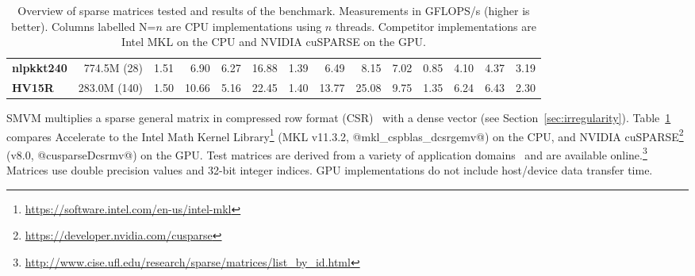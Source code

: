 \begin{table}
\begin{scriptsize}
\begin{center}
{\begin{tabular}{lrrrrrrrrrrrrr}
  \textbf{nlpkkt240}    & 774.5M (28)
                        & 1.51
                        & 6.90
                        & 6.27
                        & 16.88
                        & 1.39
                        & 6.49
                        & 8.15
                        & 7.02
                        & 0.85
                        & 4.10
                        & 4.37
                        & 3.19
                        \\

  \textbf{HV15R}        & 283.0M (140)
                        & 1.50
                        & 10.66
                        & 5.16
                        & 22.45
                        & 1.40
                        & 13.77
                        & 25.08
                        & 9.75
                        & 1.35
                        & 6.24
                        & 6.43
                        & 2.30
                        \\

  \bottomrule
\end{tabular}}
\end{center}
\end{scriptsize}
\caption{Overview of sparse matrices tested and results of the benchmark.
Measurements in GFLOPS/s (higher is better). Columns labelled N=$n$ are CPU
implementations using $n$ threads. Competitor implementations are Intel MKL on
the CPU and NVIDIA cuSPARSE on the GPU.}
\label{tab:smvm}
\end{table}

SMVM multiplies a sparse general matrix in compressed row format
(CSR)~\cite{Chatterjee:1990vj} with a dense vector (see Section~\ref{sec:irregularity}). Table~\ref{tab:smvm} compares Accelerate to the Intel Math Kernel Library\footnote{\url{https://software.intel.com/en-us/intel-mkl}} (MKL v11.3.2,
@mkl_cspblas_dcsrgemv@) on the CPU, and NVIDIA cuSPARSE\footnote{\url{https://developer.nvidia.com/cusparse}} (v8.0,
@cusparseDcsrmv@) on the GPU. Test matrices are derived from a variety of
application domains~\cite{sparse_matrix_collection} and are available
online.\footnote{\url{http://www.cise.ufl.edu/research/sparse/matrices/list_by_id.html}}
Matrices use double precision values and 32-bit integer indices. GPU
implementations do not include host/device data transfer time.


